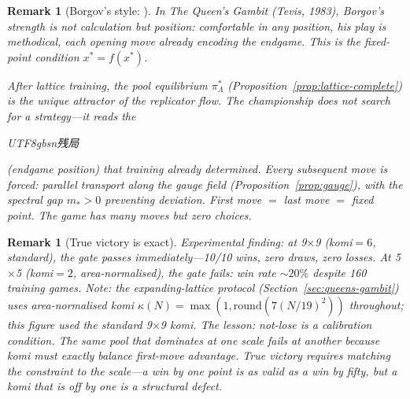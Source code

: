 \documentclass[11pt,a4paper]{article}
\newtheorem{remark}[theorem]{Remark}
\begin{document}
\begin{remark}[Borgov's style:
  \begin{CJK}{UTF8}{gbsn}残局\end{CJK} as opening]%
\label{rem:borgov-style}
In \emph{The Queen's Gambit} (Tevis, 1983),
Borgov's strength is not calculation but \emph{position}:
comfortable in any position, his play is methodical,
each opening move already encoding the endgame.
This is the fixed-point condition $x^* = f(x^*)$.

After lattice training, the pool equilibrium
$\pi^*_\Lambda$
(Proposition~\ref{prop:lattice-complete})
is the unique attractor of the replicator flow.
The championship does not \emph{search} for a strategy---it
\emph{reads} the
\begin{CJK}{UTF8}{gbsn}残局\end{CJK}
(endgame position) that training
already determined.
Every subsequent move is forced: parallel transport
along the gauge field
(Proposition~\ref{prop:gauge}),
with the spectral gap $m_* > 0$ preventing deviation.
First move $=$ last move $=$ fixed point.
The game has many moves but zero \emph{choices}.
\end{remark}

\begin{remark}[True victory is exact]\label{rem:exact-victory}
Experimental finding: at 9$\times$9 (komi${}=6$, standard),
the gate passes immediately---10/10 wins, zero draws,
zero losses.
At 5$\times$5 (komi${}=2$, area-normalised), the gate
\emph{fails}: win rate $\sim 20\%$ despite 160 training games.
Note: the expanding-lattice protocol
(Section~\ref{sec:queens-gambit}) uses area-normalised
komi $\kappa(N) = \max(1, \mathrm{round}(7(N/19)^2))$
throughout; this figure used the standard 9$\times$9 komi.
The lesson: not-lose is a \emph{calibration} condition.
The same pool that dominates at one scale fails at another
because komi must exactly balance first-move advantage.
True victory requires matching the constraint to the
scale---a win by one point is as valid as a win by fifty,
but a komi that is off by one is a structural defect.
\end{remark}
\end{document}

